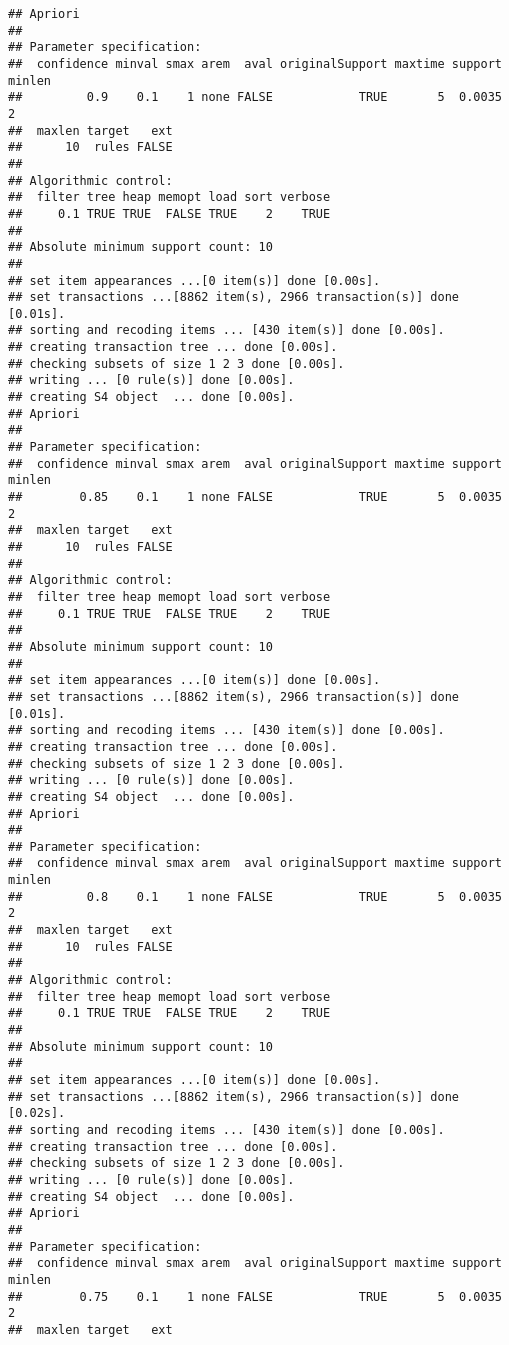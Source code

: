 \documentclass[]{article}
\begin{document}
\begin{verbatim}
## Apriori
## 
## Parameter specification:
##  confidence minval smax arem  aval originalSupport maxtime support minlen
##         0.9    0.1    1 none FALSE            TRUE       5  0.0035      2
##  maxlen target   ext
##      10  rules FALSE
## 
## Algorithmic control:
##  filter tree heap memopt load sort verbose
##     0.1 TRUE TRUE  FALSE TRUE    2    TRUE
## 
## Absolute minimum support count: 10 
## 
## set item appearances ...[0 item(s)] done [0.00s].
## set transactions ...[8862 item(s), 2966 transaction(s)] done [0.01s].
## sorting and recoding items ... [430 item(s)] done [0.00s].
## creating transaction tree ... done [0.00s].
## checking subsets of size 1 2 3 done [0.00s].
## writing ... [0 rule(s)] done [0.00s].
## creating S4 object  ... done [0.00s].
## Apriori
## 
## Parameter specification:
##  confidence minval smax arem  aval originalSupport maxtime support minlen
##        0.85    0.1    1 none FALSE            TRUE       5  0.0035      2
##  maxlen target   ext
##      10  rules FALSE
## 
## Algorithmic control:
##  filter tree heap memopt load sort verbose
##     0.1 TRUE TRUE  FALSE TRUE    2    TRUE
## 
## Absolute minimum support count: 10 
## 
## set item appearances ...[0 item(s)] done [0.00s].
## set transactions ...[8862 item(s), 2966 transaction(s)] done [0.01s].
## sorting and recoding items ... [430 item(s)] done [0.00s].
## creating transaction tree ... done [0.00s].
## checking subsets of size 1 2 3 done [0.00s].
## writing ... [0 rule(s)] done [0.00s].
## creating S4 object  ... done [0.00s].
## Apriori
## 
## Parameter specification:
##  confidence minval smax arem  aval originalSupport maxtime support minlen
##         0.8    0.1    1 none FALSE            TRUE       5  0.0035      2
##  maxlen target   ext
##      10  rules FALSE
## 
## Algorithmic control:
##  filter tree heap memopt load sort verbose
##     0.1 TRUE TRUE  FALSE TRUE    2    TRUE
## 
## Absolute minimum support count: 10 
## 
## set item appearances ...[0 item(s)] done [0.00s].
## set transactions ...[8862 item(s), 2966 transaction(s)] done [0.02s].
## sorting and recoding items ... [430 item(s)] done [0.00s].
## creating transaction tree ... done [0.00s].
## checking subsets of size 1 2 3 done [0.00s].
## writing ... [0 rule(s)] done [0.00s].
## creating S4 object  ... done [0.00s].
## Apriori
## 
## Parameter specification:
##  confidence minval smax arem  aval originalSupport maxtime support minlen
##        0.75    0.1    1 none FALSE            TRUE       5  0.0035      2
##  maxlen target   ext

\end{verbatim}
\end{document}
